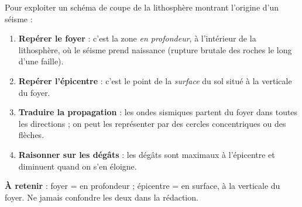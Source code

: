 \documentclass[11pt]{article}
\begin{document}
\begin{methode}
Pour exploiter un schéma de coupe de la lithosphère montrant l'origine d'un séisme :
\begin{enumerate}
\item \textbf{Repérer le foyer} : c'est la zone \emph{en profondeur}, à l'intérieur de la lithosphère, où le séisme prend naissance (rupture brutale des roches le long d'une faille).
\item \textbf{Repérer l'épicentre} : c'est le point de la \emph{surface} du sol situé à la verticale du foyer.
\item \textbf{Traduire la propagation} : les ondes sismiques partent du foyer dans toutes les directions ; on peut les représenter par des cercles concentriques ou des flèches.
\item \textbf{Raisonner sur les dégâts} : les dégâts sont maximaux à l'épicentre et diminuent quand on s'en éloigne.
\end{enumerate}
\textbf{À retenir} : foyer = en profondeur ; épicentre = en surface, à la verticale du foyer. Ne jamais confondre les deux dans la rédaction.
\end{methode}
\end{document}
